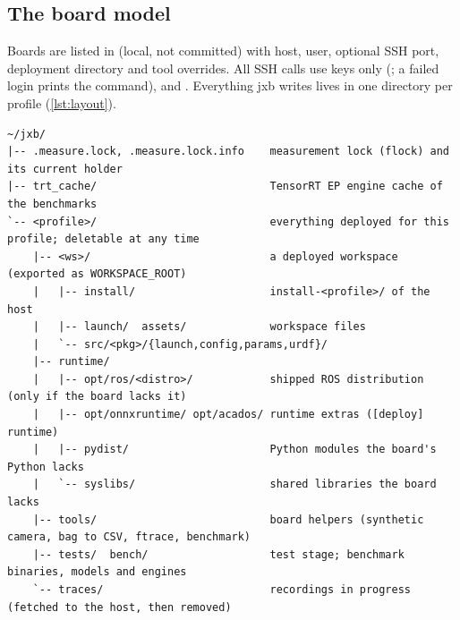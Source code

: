 \documentclass[11pt,a4paper]{article}
\newcommand{\codeb}[1]{\texttt{\detokenize{#1}}}      %
\newcommand{\jxb}{\textsf{jxb}}
\begin{document}
\subsection{The board model}
Boards are listed in  (local, not committed) with host, user, optional SSH port, deployment
directory and tool overrides. All SSH calls use keys only (; a failed login prints the
 command),  and . Everything \jxb{}
writes lives in one directory per profile (\cref{lst:layout}).

\begin{lstlisting}[caption={Layout of a board's \codeb{~/jxb/} directory.}, label={lst:layout}]
~/jxb/
|-- .measure.lock, .measure.lock.info    measurement lock (flock) and its current holder
|-- trt_cache/                           TensorRT EP engine cache of the benchmarks
`-- <profile>/                           everything deployed for this profile; deletable at any time
    |-- <ws>/                            a deployed workspace (exported as WORKSPACE_ROOT)
    |   |-- install/                     install-<profile>/ of the host
    |   |-- launch/  assets/             workspace files
    |   `-- src/<pkg>/{launch,config,params,urdf}/
    |-- runtime/
    |   |-- opt/ros/<distro>/            shipped ROS distribution (only if the board lacks it)
    |   |-- opt/onnxruntime/ opt/acados/ runtime extras ([deploy] runtime)
    |   |-- pydist/                      Python modules the board's Python lacks
    |   `-- syslibs/                     shared libraries the board lacks
    |-- tools/                           board helpers (synthetic camera, bag to CSV, ftrace, benchmark)
    |-- tests/  bench/                   test stage; benchmark binaries, models and engines
    `-- traces/                          recordings in progress (fetched to the host, then removed)
\end{lstlisting}
\end{document}
